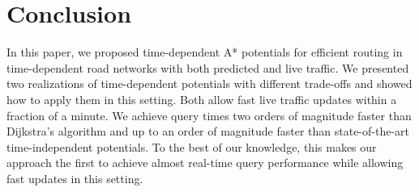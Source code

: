 \documentclass[a4paper,UKenglish,cleveref, autoref, thm-restate,anonymous]{lipics-v2021}
\begin{document}
\section{Conclusion}

In this paper, we proposed time-dependent A* potentials for efficient routing in time-dependent road networks with both predicted and live traffic.
We presented two realizations of time-dependent potentials with different trade-offs and showed how to apply them in this setting.
Both allow fast live traffic updates within a fraction of a minute.
We achieve query times two orders of magnitude faster than Dijkstra's algorithm and up to an order of magnitude faster than state-of-the-art time-independent potentials.
To the best of our knowledge, this makes our approach the first to achieve almost real-time query performance while allowing fast updates in this setting.



\end{document}
